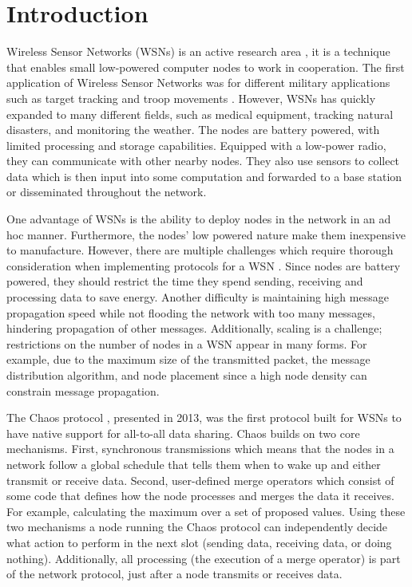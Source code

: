 \chapter{Introduction}
Wireless Sensor Networks (WSNs) is an active research area \cite{Yick2008-wsn-survey, Mahmood2015-reliability-survey}, it is a technique that enables small low-powered computer nodes to work in cooperation. The first application of Wireless Sensor Networks was for different military applications such as target tracking and troop movements \cite{Yick2008-wsn-survey}. However, WSNs has quickly expanded to many different fields, such as medical equipment, tracking natural disasters, and monitoring the weather. The nodes are battery powered, with limited processing and storage capabilities. Equipped with a low-power radio, they can communicate with other nearby nodes. They also use sensors to collect data which is then input into some computation and forwarded to a base station or disseminated throughout the network.

One advantage of WSNs is the ability to deploy nodes in the network in an ad hoc manner. Furthermore, the nodes' low powered nature make them inexpensive to manufacture. However, there are multiple challenges which require thorough consideration when implementing protocols for a WSN \cite{Yick2008-wsn-survey}. Since nodes are battery powered, they should restrict the time they spend sending, receiving and processing data to save energy. Another difficulty is maintaining high message propagation speed while not flooding the network with too many messages, hindering propagation of other messages. Additionally, scaling is a challenge; restrictions on the number of nodes in a WSN appear in many forms. For example, due to the maximum size of the transmitted packet, the message distribution algorithm, and node placement since a high node density can constrain message propagation.

The Chaos protocol \cite{chaos-introduction-paper}, presented in 2013, was the first protocol built for WSNs to have native support for all-to-all data sharing. Chaos builds on two core mechanisms. First, synchronous transmissions which means that the nodes in a network follow a global schedule that tells them when to wake up and either transmit or receive data. Second, user-defined merge operators which consist of some code that defines how the node processes and merges the data it receives. For example, calculating the maximum over a set of proposed values. Using these two mechanisms a node running the Chaos protocol can independently decide what action to perform in the next slot (sending data, receiving data, or doing nothing). Additionally, all processing (the execution of a merge operator) is part of the network protocol, just after a node transmits or receives data.

